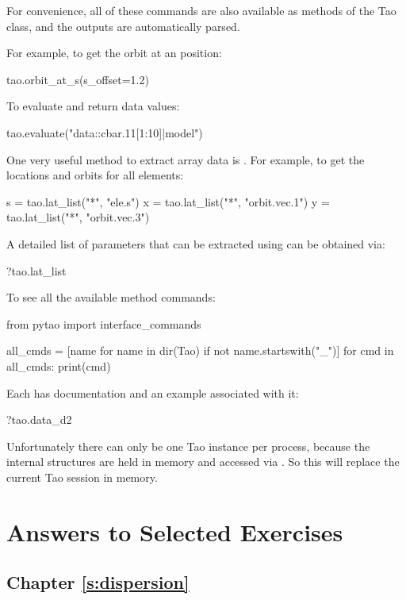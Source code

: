 \documentclass{hitec}     %
\begin{document}
{{{{For convenience, all of these commands are also available as methods of the Tao class, and the outputs are automatically parsed.

For example, to get the orbit at an  position:
\begin{code}
tao.orbit_at_s(s_offset=1.2)
\end{code}

To evaluate and return data values:
\begin{code}
tao.evaluate("data::cbar.11[1:10]|model")
\end{code}

One very useful method to extract array data is . For example, to get the locations and orbits for all elements:
\begin{code}
s = tao.lat_list("*", "ele.s")
x = tao.lat_list("*", "orbit.vec.1")
y = tao.lat_list("*", "orbit.vec.3")
\end{code}

A detailed list of parameters that can be extracted using  can be obtained via:
\begin{code}
?tao.lat_list
\end{code}

To see all the available method commands:
\begin{code}
from pytao import interface_commands

all_cmds = [name for name in dir(Tao) if not name.startswith("_")]
for cmd in all_cmds:
    print(cmd)
\end{code}

Each has documentation and an example associated with it:
\begin{code}
?tao.data_d2
\end{code}

Unfortunately there can only be one Tao instance per process, because the internal structures are held in memory and accessed via . So this will replace the current Tao session in memory.

\section{Answers to Selected Exercises}

\subsection{Chapter \ref{s:dispersion}}   %

}}}}
\end{document}
